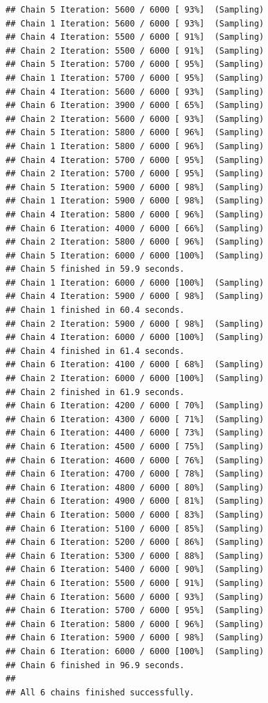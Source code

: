 \documentclass[
]{article}
\begin{document}
\begin{verbatim}
## Chain 5 Iteration: 5600 / 6000 [ 93%]  (Sampling) 
## Chain 1 Iteration: 5600 / 6000 [ 93%]  (Sampling) 
## Chain 4 Iteration: 5500 / 6000 [ 91%]  (Sampling) 
## Chain 2 Iteration: 5500 / 6000 [ 91%]  (Sampling) 
## Chain 5 Iteration: 5700 / 6000 [ 95%]  (Sampling) 
## Chain 1 Iteration: 5700 / 6000 [ 95%]  (Sampling) 
## Chain 4 Iteration: 5600 / 6000 [ 93%]  (Sampling) 
## Chain 6 Iteration: 3900 / 6000 [ 65%]  (Sampling) 
## Chain 2 Iteration: 5600 / 6000 [ 93%]  (Sampling) 
## Chain 5 Iteration: 5800 / 6000 [ 96%]  (Sampling) 
## Chain 1 Iteration: 5800 / 6000 [ 96%]  (Sampling) 
## Chain 4 Iteration: 5700 / 6000 [ 95%]  (Sampling) 
## Chain 2 Iteration: 5700 / 6000 [ 95%]  (Sampling) 
## Chain 5 Iteration: 5900 / 6000 [ 98%]  (Sampling) 
## Chain 1 Iteration: 5900 / 6000 [ 98%]  (Sampling) 
## Chain 4 Iteration: 5800 / 6000 [ 96%]  (Sampling) 
## Chain 6 Iteration: 4000 / 6000 [ 66%]  (Sampling) 
## Chain 2 Iteration: 5800 / 6000 [ 96%]  (Sampling) 
## Chain 5 Iteration: 6000 / 6000 [100%]  (Sampling) 
## Chain 5 finished in 59.9 seconds.
## Chain 1 Iteration: 6000 / 6000 [100%]  (Sampling) 
## Chain 4 Iteration: 5900 / 6000 [ 98%]  (Sampling) 
## Chain 1 finished in 60.4 seconds.
## Chain 2 Iteration: 5900 / 6000 [ 98%]  (Sampling) 
## Chain 4 Iteration: 6000 / 6000 [100%]  (Sampling) 
## Chain 4 finished in 61.4 seconds.
## Chain 6 Iteration: 4100 / 6000 [ 68%]  (Sampling) 
## Chain 2 Iteration: 6000 / 6000 [100%]  (Sampling) 
## Chain 2 finished in 61.9 seconds.
## Chain 6 Iteration: 4200 / 6000 [ 70%]  (Sampling) 
## Chain 6 Iteration: 4300 / 6000 [ 71%]  (Sampling) 
## Chain 6 Iteration: 4400 / 6000 [ 73%]  (Sampling) 
## Chain 6 Iteration: 4500 / 6000 [ 75%]  (Sampling) 
## Chain 6 Iteration: 4600 / 6000 [ 76%]  (Sampling) 
## Chain 6 Iteration: 4700 / 6000 [ 78%]  (Sampling) 
## Chain 6 Iteration: 4800 / 6000 [ 80%]  (Sampling) 
## Chain 6 Iteration: 4900 / 6000 [ 81%]  (Sampling) 
## Chain 6 Iteration: 5000 / 6000 [ 83%]  (Sampling) 
## Chain 6 Iteration: 5100 / 6000 [ 85%]  (Sampling) 
## Chain 6 Iteration: 5200 / 6000 [ 86%]  (Sampling) 
## Chain 6 Iteration: 5300 / 6000 [ 88%]  (Sampling) 
## Chain 6 Iteration: 5400 / 6000 [ 90%]  (Sampling) 
## Chain 6 Iteration: 5500 / 6000 [ 91%]  (Sampling) 
## Chain 6 Iteration: 5600 / 6000 [ 93%]  (Sampling) 
## Chain 6 Iteration: 5700 / 6000 [ 95%]  (Sampling) 
## Chain 6 Iteration: 5800 / 6000 [ 96%]  (Sampling) 
## Chain 6 Iteration: 5900 / 6000 [ 98%]  (Sampling) 
## Chain 6 Iteration: 6000 / 6000 [100%]  (Sampling) 
## Chain 6 finished in 96.9 seconds.
## 
## All 6 chains finished successfully.

\end{verbatim}
\end{document}
